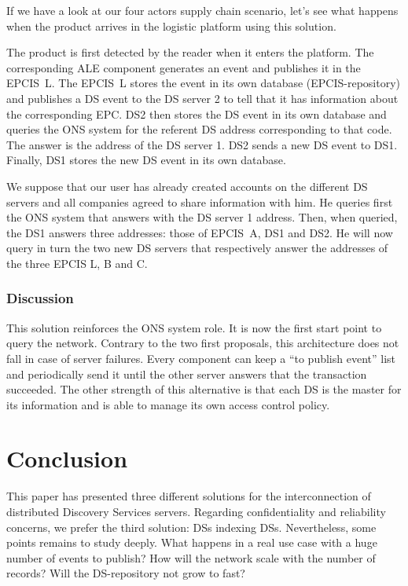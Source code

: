 \documentclass[a4paper]{llncs}
\begin{document}
If we have a look at our four actors supply chain scenario, let's see what happens when the product
arrives in the logistic platform using this solution.

The product is first detected by the reader when it enters the platform. The corresponding ALE
component generates an event and publishes it in the EPCIS~L. The EPCIS~L stores the event in its
own database (EPCIS-repository) and publishes a DS event to the DS server 2 to tell that it has
information about the corresponding EPC. DS2 then stores the DS event in its own database and
queries the ONS system for the referent DS address corresponding to that code. The answer is the
address of the DS server 1. DS2 sends a new DS event to DS1. Finally, DS1 stores the new DS event in
its own database.

We suppose that our user has already created accounts on the different DS servers and all companies
agreed to share information with him. He queries first the ONS system that answers with the DS
server 1 address. Then, when queried, the DS1 answers three addresses: those of EPCIS~A, DS1 and
DS2. He will now query in turn the two new DS servers that respectively answer the addresses of the
three EPCIS L, B and C.

\subsubsection{Discussion}

This solution reinforces the ONS system role. It is now the first start point to query the network.
Contrary to the two first proposals, this architecture does not fall in case of server failures.
Every component can keep a ``to publish event'' list and periodically send it until the other server
answers that the transaction succeeded. The other strength of this alternative is that each DS is
the master for its information and is able to manage its own access control policy.


\section{Conclusion}

This paper has presented three different solutions for the interconnection of distributed Discovery
Services servers. Regarding confidentiality and reliability concerns, we prefer the third solution:
DSs indexing DSs. Nevertheless, some points remains to study deeply.  What happens in a real use
case with a huge number of events to publish? How will the network scale with the number of records?
Will the DS-repository not grow to fast?
\end{document}
